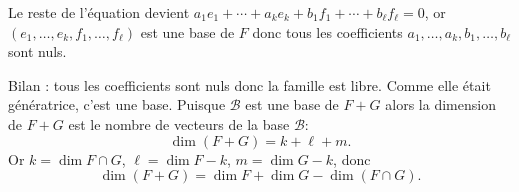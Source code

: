 {{Le reste de l'\'equation devient $a_1e_1+\cdots +a_ke_k+b_1f_1+\cdots +b_\ell f_\ell=0$,
or $(e_1,\ldots, e_k,f_1,\ldots,f_\ell)$ est une base de $F$ donc tous les coefficients 
$a_1,\ldots,a_k,b_1,\ldots,b_\ell$ sont nuls.

Bilan : tous les coefficients sont nuls donc la famille est libre. Comme elle \'etait g\'en\'eratrice, c'est une base.
Puisque $\mathcal{B}$ est une base de $F+G$ alors la dimension de $F+G$ est le nombre de vecteurs de la base $\mathcal{B}$:
$$\dim (F+G) = k + \ell + m.$$
Or $k=\dim F\cap G$, $\ell = \dim F - k$, $m=\dim G - k$, donc 
$$\dim (F+G) = \dim F + \dim G - \dim (F\cap G).$$
}
}
